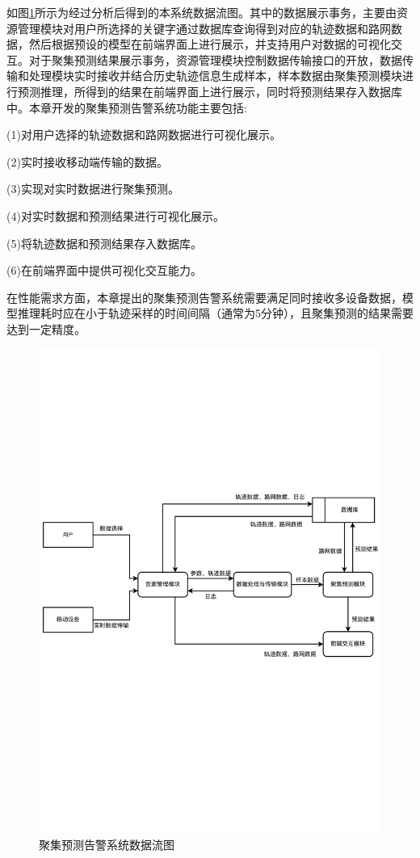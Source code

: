 \documentclass[master]{thesis-uestc}
\begin{document}
如图\ref{Figure.5.2}所示为经过分析后得到的本系统数据流图。其中的数据展示事务，主要由资源管理模块对用户所选择的关键字通过数据库查询得到对应的轨迹数据和路网数据，然后根据预设的模型在前端界面上进行展示，并支持用户对数据的可视化交互。对于聚集预测结果展示事务，资源管理模块控制数据传输接口的开放，数据传输和处理模块实时接收并结合历史轨迹信息生成样本，样本数据由聚集预测模块进行预测推理，所得到的结果在前端界面上进行展示，同时将预测结果存入数据库中。本章开发的聚集预测告警系统功能主要包括:

(1)对用户选择的轨迹数据和路网数据进行可视化展示。 

(2)实时接收移动端传输的数据。

(3)实现对实时数据进行聚集预测。

(4)对实时数据和预测结果进行可视化展示。

(5)将轨迹数据和预测结果存入数据库。

(6)在前端界面中提供可视化交互能力。

在性能需求方面，本章提出的聚集预测告警系统需要满足同时接收多设备数据，模型推理耗时应在小于轨迹采样的时间间隔（通常为5分钟），且聚集预测的结果需要达到一定精度。

\begin{figure}[!ht]
\centering
\includegraphics[width=1.0\linewidth]{./pic/数据流图.pdf}
\caption{聚集预测告警系统数据流图}
\label{Figure.5.2}
\end{figure}
\end{document}
